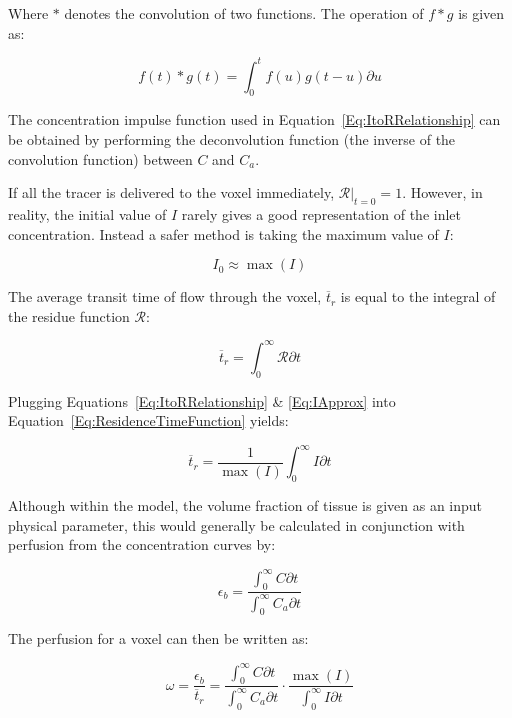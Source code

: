 \documentclass[11pt,english,a4paper,twoside,openright]{report}
\begin{document}
{{{{{{{{Where $*$ denotes the convolution of two functions. The operation of $f*g$ is given as:

\begin{equation}
f(t)*g(t) = \int_{0}^{t}f(u)g(t-u)\partial u
\label{Eq:ConvolutionDef}
\end{equation}

The concentration impulse function used in Equation~\ref{Eq:ItoRRelationship} can be obtained by performing the deconvolution function (the inverse of the convolution function) between $C$ and $C_{a}$.

If all the tracer is delivered to the voxel immediately, $\mathcal{R}|_{t=0} = 1$. However, in reality, the initial value of $I$ rarely gives a good representation of the inlet concentration. Instead a safer method is taking the maximum value of $I$: 

\begin{equation}
\label{Eq:IApprox}
I_{0}\approx\max(I)
\end{equation}

The average transit time of flow through the voxel, $\overline{t}_{r}$ is equal to the integral of the residue function $\mathcal{R}$: 

\begin{equation}
\overline{t}_{r} = \int_{0}^{\infty}\mathcal{R}\partial t
\label{Eq:ResidenceTimeFunction}
\end{equation}

Plugging Equations~\ref{Eq:ItoRRelationship} \& \ref{Eq:IApprox} into Equation~\ref{Eq:ResidenceTimeFunction} yields:

\begin{equation}
\overline{t}_{r} = \frac{1}{\max(I)} \int_{0}^{\infty}I\partial t
\label{Eq:MeanTransitTime}
\end{equation}

Although within the model, the volume fraction of tissue is given as an input physical parameter, this would generally be calculated in conjunction with perfusion from the concentration curves by:

\begin{equation}
\epsilon_{b} = \frac{\int_{0}^{\infty}C\partial t}{\int_{0}^{\infty}C_{a}\partial t}
\label{Eq:PredictingPorosity}
\end{equation}

The perfusion for a voxel can then be written as:

\begin{equation}
\omega = \frac{\epsilon_{b}}{\overline{t}_{r}}=\frac{\int_{0}^{\infty}C\partial t}{\int_{0}^{\infty}C_{a}\partial t}\cdot\frac{\max(I)}{\int_{0}^{\infty}I\partial t}
\label{Eq:CerebralBloodFlow}
\end{equation}

}}}}}}}}
\end{document}
